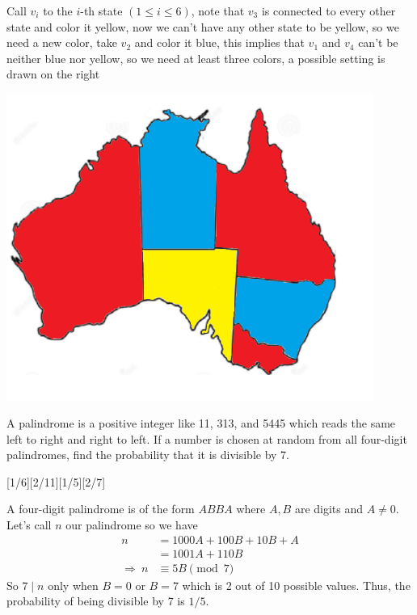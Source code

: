 \documentclass[12pt]{article}
\newcounter{problem}
\begin{document}
\begin{solution}[B]
\begin{minipage}[b][][b]{0.75\linewidth}\vspace{0pt}%
    Call $v_i$ to the $i$-th state $(1\leq i \leq 6)$, note that $v_3$ is connected to every other state and color it yellow, now we can't have any other state to be yellow, so we need a new color, take $v_2$ and color it blue, this implies that $v_1$ and $v_4$ can't be neither blue nor yellow, so we need at least three colors, a possible setting is drawn on the right
\end{minipage}\hfill%
\begin{minipage}[b][][b]{0.2\linewidth}%
  \includegraphics[width=0.9\textwidth]{painted_map.png}
\vspace{3mm}
\end{minipage}
\end{solution}
\vspace{-5mm}

\begin{problem}
   A palindrome is a positive integer like 11, 313, and 5445 which reads the same left to right and right to left. If a number is chosen at random from all four-digit palindromes, find the probability that it is divisible by 7.
\end{problem}
[1/6][2/11][1/5][2/7]

\begin{solution}[D]
    A four-digit palindrome is of the form $ABBA$ where $A,B$ are digits and $A\neq0$. Let's call $n$ our palindrome so we have
    \begin{align*}
        n &= 1000A+100B+10B+A\\ 
        &= 1001A+110B\\
        \Rightarrow\ n &\equiv 5B \pmod7
    \end{align*}
    So $7\mid n$ only when $B=0$ or $B=7$ which is 2 out of 10 possible values. Thus, the probability of being divisible by 7 is $\boxed{1/5}$. 
\end{solution}
\end{document}
